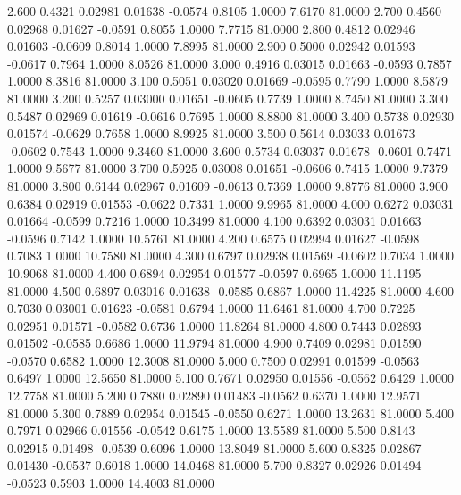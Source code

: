    2.600   0.4321   0.02981   0.01638  -0.0574   0.8105   1.0000   7.6170  81.0000
   2.700   0.4560   0.02968   0.01627  -0.0591   0.8055   1.0000   7.7715  81.0000
   2.800   0.4812   0.02946   0.01603  -0.0609   0.8014   1.0000   7.8995  81.0000
   2.900   0.5000   0.02942   0.01593  -0.0617   0.7964   1.0000   8.0526  81.0000
   3.000   0.4916   0.03015   0.01663  -0.0593   0.7857   1.0000   8.3816  81.0000
   3.100   0.5051   0.03020   0.01669  -0.0595   0.7790   1.0000   8.5879  81.0000
   3.200   0.5257   0.03000   0.01651  -0.0605   0.7739   1.0000   8.7450  81.0000
   3.300   0.5487   0.02969   0.01619  -0.0616   0.7695   1.0000   8.8800  81.0000
   3.400   0.5738   0.02930   0.01574  -0.0629   0.7658   1.0000   8.9925  81.0000
   3.500   0.5614   0.03033   0.01673  -0.0602   0.7543   1.0000   9.3460  81.0000
   3.600   0.5734   0.03037   0.01678  -0.0601   0.7471   1.0000   9.5677  81.0000
   3.700   0.5925   0.03008   0.01651  -0.0606   0.7415   1.0000   9.7379  81.0000
   3.800   0.6144   0.02967   0.01609  -0.0613   0.7369   1.0000   9.8776  81.0000
   3.900   0.6384   0.02919   0.01553  -0.0622   0.7331   1.0000   9.9965  81.0000
   4.000   0.6272   0.03031   0.01664  -0.0599   0.7216   1.0000  10.3499  81.0000
   4.100   0.6392   0.03031   0.01663  -0.0596   0.7142   1.0000  10.5761  81.0000
   4.200   0.6575   0.02994   0.01627  -0.0598   0.7083   1.0000  10.7580  81.0000
   4.300   0.6797   0.02938   0.01569  -0.0602   0.7034   1.0000  10.9068  81.0000
   4.400   0.6894   0.02954   0.01577  -0.0597   0.6965   1.0000  11.1195  81.0000
   4.500   0.6897   0.03016   0.01638  -0.0585   0.6867   1.0000  11.4225  81.0000
   4.600   0.7030   0.03001   0.01623  -0.0581   0.6794   1.0000  11.6461  81.0000
   4.700   0.7225   0.02951   0.01571  -0.0582   0.6736   1.0000  11.8264  81.0000
   4.800   0.7443   0.02893   0.01502  -0.0585   0.6686   1.0000  11.9794  81.0000
   4.900   0.7409   0.02981   0.01590  -0.0570   0.6582   1.0000  12.3008  81.0000
   5.000   0.7500   0.02991   0.01599  -0.0563   0.6497   1.0000  12.5650  81.0000
   5.100   0.7671   0.02950   0.01556  -0.0562   0.6429   1.0000  12.7758  81.0000
   5.200   0.7880   0.02890   0.01483  -0.0562   0.6370   1.0000  12.9571  81.0000
   5.300   0.7889   0.02954   0.01545  -0.0550   0.6271   1.0000  13.2631  81.0000
   5.400   0.7971   0.02966   0.01556  -0.0542   0.6175   1.0000  13.5589  81.0000
   5.500   0.8143   0.02915   0.01498  -0.0539   0.6096   1.0000  13.8049  81.0000
   5.600   0.8325   0.02867   0.01430  -0.0537   0.6018   1.0000  14.0468  81.0000
   5.700   0.8327   0.02926   0.01494  -0.0523   0.5903   1.0000  14.4003  81.0000

